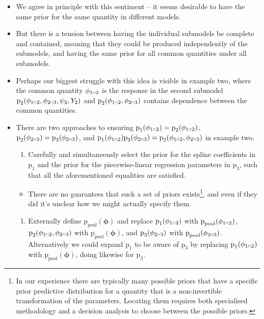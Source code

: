 \documentclass[
  10pt,
  a4paper,
]{article}
\providecommand{\tightlist}{%
  \setlength{\itemsep}{0pt}\setlength{\parskip}{0pt}}
\let\Oldcap\cap
\renewcommand{\cap}{\mathrel{\mathsmaller{\Oldcap}}}
\newcommand{\pd}{\text{p}}
\begin{document}
\begin{itemize}
\tightlist
\item
  We agree in principle with this sentiment -- it seems desirable to
  have the same prior for the same quantity in different models.
\item
  But there is a tension between having the individual submodels be
  complete and contained, meaning that they could be produced
  independently of the submodels, and having the same prior for all
  common quantities under all submodels.
\item
  Perhaps our biggest struggle with this idea is visible in example two,
  where the common quantity \(\phi_{1 \cap 2}\) is the response in the
  second submodel
  \(\pd_{2}(\phi_{1 \cap 2}, \phi_{2 \cap 3}, \psi_{2}, Y_{2})\) and
  \(\pd_{2}(\phi_{1 \cap 2}, \phi_{2 \cap 3})\) contains dependence
  between the common quantities.
\item
  There are two approaches to ensuring
  \(\pd_{1}(\phi_{1 \cap 2}) = \pd_{2}(\phi_{1 \cap 2})\),
  \(\pd_{2}(\phi_{2 \cap 3}) = \pd_{3}(\phi_{2 \cap 3})\), and
  \(\pd_{1}(\phi_{1 \cap 2})\pd_{3}(\phi_{2 \cap 3}) = \pd_{2}(\phi_{1 \cap 2}, \phi_{2 \cap 3})\)
  in example two.

  \begin{enumerate}
  \def\labelenumi{\arabic{enumi}.}
  \tightlist
  \item
    Carefully and simultaneously select the prior for the spline
    coefficients in \(\pd_{1}\) and the prior for the piecewise-linear
    regression parameters in \(\pd_{3}\), such that all the
    aforementioned equalities are satisfied.
  \end{enumerate}

  \begin{itemize}
  \tightlist
  \item
    There are no guarantees that such a set of priors exists\footnote{In
      our experience there are typically many possible priors that have
      a specific prior predictive distribution for a quantity that is a
      non-invertible transformation of the parameters. Locating them
      requires both specialised methodology and a decision analysis to
      choose between the possible priors.}, and even if they did it's
    unclear how we might actually specify them.
  \end{itemize}

  \begin{enumerate}
  \def\labelenumi{\arabic{enumi}.}
  \tightlist
  \item
    Externally define \(\pd_{\text{pool}}(\boldsymbol{\phi})\) and
    replace \(\pd_{1}(\phi_{1 \cap 2})\) with
    \(\pd_{\text{pool}}(\phi_{1 \cap 2})\),
    \(\pd_{2}(\phi_{1 \cap 2}, \phi_{2 \cap 3})\) with
    \(\pd_{\text{pool}}(\boldsymbol{\phi})\), and
    \(\pd_{3}(\phi_{2 \cap 3})\) with
    \(\pd_{\text{pool}}(\phi_{2 \cap 3})\). Alternatively we could
    expand \(\pd_{1}\) to be aware of \(\pd_{3}\) by replacing
    \(\pd_{1}(\phi_{1 \cap 2})\) with
    \(\pd_{\text{pool}}(\boldsymbol{\phi})\), doing likewise for
    \(\pd_{3}\).
  \end{enumerate}


\end{itemize}
\end{document}
